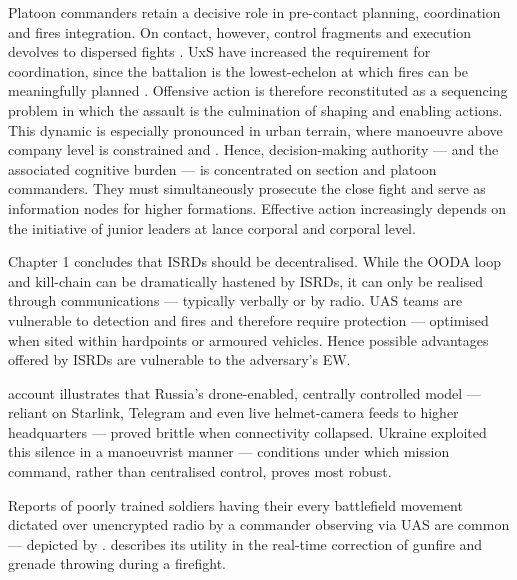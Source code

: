 Platoon commanders retain a decisive role in pre-contact planning, coordination and fires integration. On contact, however, control fragments and execution devolves to dispersed fights \parencite{darragh_participant_4}. UxS have increased the requirement for coordination, since the battalion is the lowest-echelon at which fires can be meaningfully planned \parencite{WATLING_2025B}. Offensive action is therefore reconstituted as a sequencing problem in which the assault is the culmination of shaping and enabling actions. This dynamic is especially pronounced in urban terrain, where manoeuvre above company level is constrained \parencite{stu_lyle_participant_11} and \parencite[~144--147]{Watling_book}. Hence, decision-making authority --- and the associated cognitive burden --- is concentrated on section and platoon commanders. They must simultaneously prosecute the close fight and serve as information nodes for higher formations. Effective action increasingly depends on the initiative of junior leaders at lance corporal and corporal level.



Chapter 1 concludes that ISRDs should be decentralised. While the OODA loop and kill-chain can be dramatically hastened by ISRDs, it can only be realised through communications --- typically verbally or by radio. UAS teams are vulnerable to detection and fires and therefore require protection --- optimised when sited within hardpoints or armoured vehicles. Hence possible advantages offered by ISRDs are vulnerable to the adversary's EW. 

 account illustrates that Russia’s drone-enabled, centrally controlled model --- reliant on Starlink, Telegram and even live helmet-camera feeds to higher headquarters --- proved brittle when connectivity collapsed. Ukraine exploited this silence in a manoeuvrist manner --- conditions under which mission command, rather than centralised control, proves most robust.


Reports of poorly trained soldiers having their every battlefield movement dictated over unencrypted radio by a commander observing via UAS are common --- depicted by \textcite{Dogwoof_2000m_Andriivka}. \textcite{dan_participant_1} describes its utility in the real-time correction of gunfire and grenade throwing during a firefight. 



